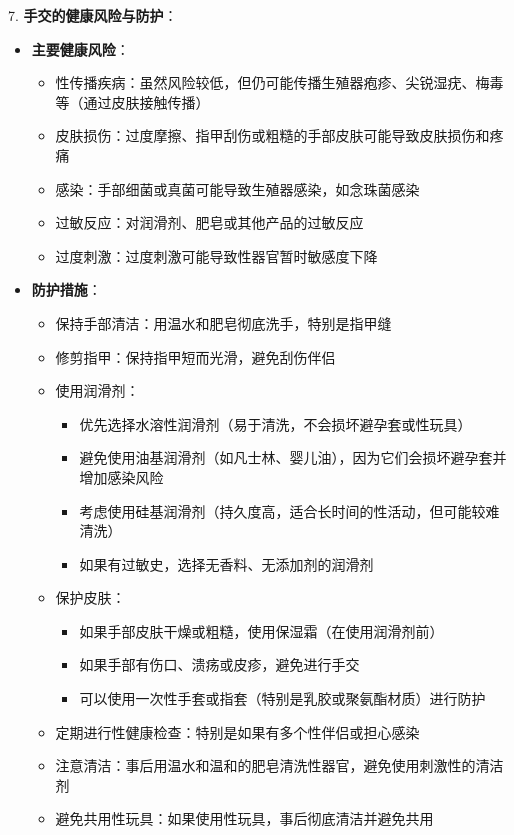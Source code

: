 \documentclass[12pt,UTF8]{ctexbook}
\begin{document}
7. \textbf{手交的健康风险与防护}：
\begin{itemize}
	\item \textbf{主要健康风险}：
	\begin{itemize}
		\item 性传播疾病：虽然风险较低，但仍可能传播生殖器疱疹、尖锐湿疣、梅毒等（通过皮肤接触传播）
		\item 皮肤损伤：过度摩擦、指甲刮伤或粗糙的手部皮肤可能导致皮肤损伤和疼痛
		\item 感染：手部细菌或真菌可能导致生殖器感染，如念珠菌感染
		\item 过敏反应：对润滑剂、肥皂或其他产品的过敏反应
		\item 过度刺激：过度刺激可能导致性器官暂时敏感度下降
	\end{itemize}
	\item \textbf{防护措施}：
	\begin{itemize}
		\item 保持手部清洁：用温水和肥皂彻底洗手，特别是指甲缝
		\item 修剪指甲：保持指甲短而光滑，避免刮伤伴侣
		\item 使用润滑剂：
		\begin{itemize}
			\item 优先选择水溶性润滑剂（易于清洗，不会损坏避孕套或性玩具）
			\item 避免使用油基润滑剂（如凡士林、婴儿油），因为它们会损坏避孕套并增加感染风险
			\item 考虑使用硅基润滑剂（持久度高，适合长时间的性活动，但可能较难清洗）
			\item 如果有过敏史，选择无香料、无添加剂的润滑剂
		\end{itemize}
		\item 保护皮肤：
		\begin{itemize}
			\item 如果手部皮肤干燥或粗糙，使用保湿霜（在使用润滑剂前）
			\item 如果手部有伤口、溃疡或皮疹，避免进行手交
			\item 可以使用一次性手套或指套（特别是乳胶或聚氨酯材质）进行防护
		\end{itemize}
		\item 定期进行性健康检查：特别是如果有多个性伴侣或担心感染
		\item 注意清洁：事后用温水和温和的肥皂清洗性器官，避免使用刺激性的清洁剂
		\item 避免共用性玩具：如果使用性玩具，事后彻底清洁并避免共用
	\end{itemize}
\end{itemize}
\end{document}
